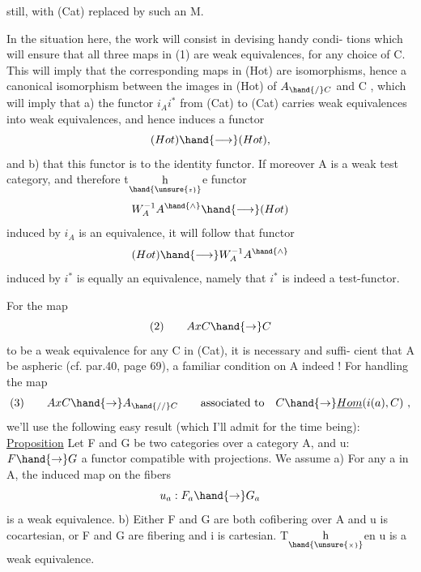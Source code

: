 
still, with (Cat) replaced by such an M.

In the situation here, the work will consist in devising handy condi-%
tions   which will ensure that all three maps in (1) are weak equivalences,
for any choice of C. This will imply that the corresponding maps in (Hot)
are isomorphisms, hence a canonical isomorphism between the images in
(Hot) of $A_{\hand{/}C}$ and C , which will imply that a) the functor $i_A i^*$ from
(Cat) to (Cat) carries weak equivalences into weak equivalences, and
hence induces a functor
\[ (Hot) \hand{\longrightarrow} (Hot) , \]
and b) that this functor is   to the identity functor. If
moreover A is a weak test category, and therefore t$\underset{\hand{\unsure{\scriptscriptstyle z}}}{\mathrm h}$e functor
\[ W_A^{-1}A^{\hand{\wedge}} \hand{\longrightarrow} (Hot) \]
induced by $i_A$ is an equivalence, it will follow that   functor
\[ (Hot) \hand{\longrightarrow} W_A^{-1}A^{\hand{\wedge}} \]
induced by $i^*$ is equally an equivalence, namely that $i^*$ is indeed a
test-functor.

For the map
\[ (2) \qquad AxC \hand{\rightarrow} C \]
to be a weak equivalence for any C in (Cat), it is necessary and suffi-%
cient that A be aspheric (cf. par.40, page 69), a familiar condition on
A indeed ! For handling the map
\[ (3) \qquad AxC \hand{\rightarrow} A_{\hand{//}C} \qquad \text{associated to} \quad C \hand{\rightarrow} \underline{Hom}(i(a),C) \ , \]
we'll use the following easy result (which I'll admit for the time being):
\uline{Proposition} Let F and G be two  categories over a category A, and
u: $F \hand{\rightarrow} G$ a functor compatible with projections. We assume
a) For any a in A, the induced map on the fibers
\[ u_a : F_a \hand{\rightarrow} G_a \]
is a weak equivalence.
b) Either F and G are both cofibering over A and u is cocartesian,
or F and G are fibering and i is cartesian.
T$\underset{\hand{\unsure{\scriptscriptstyle\times}}}{\mathrm h}$en u is a weak equivalence.

